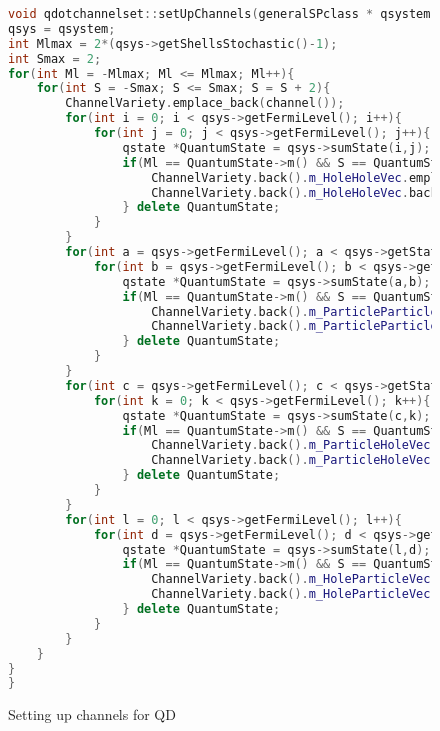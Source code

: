 \documentclass[twoside,english]{uiofysmaster}
\theoremstyle{definition}
\begin{document}
\begin{figure}
\begin{lstlisting}[language=C++]
void qdotchannelset::setUpChannels(generalSPclass * qsystem){
qsys = qsystem;
int Mlmax = 2*(qsys->getShellsStochastic()-1);
int Smax = 2;
for(int Ml = -Mlmax; Ml <= Mlmax; Ml++){
	for(int S = -Smax; S <= Smax; S = S + 2){
		ChannelVariety.emplace_back(channel());
		for(int i = 0; i < qsys->getFermiLevel(); i++){
			for(int j = 0; j < qsys->getFermiLevel(); j++){
				qstate *QuantumState = qsys->sumState(i,j);
				if(Ml == QuantumState->m() && S == QuantumState->s() && i != j){
					ChannelVariety.back().m_HoleHoleVec.emplace_back(channelindexpair());
					ChannelVariety.back().m_HoleHoleVec.back().set(i, j);
				} delete QuantumState;
			}
		}
		for(int a = qsys->getFermiLevel(); a < qsys->getStatesStochastic(); a++){
			for(int b = qsys->getFermiLevel(); b < qsys->getStatesStochastic(); b++){
				qstate *QuantumState = qsys->sumState(a,b);
				if(Ml == QuantumState->m() && S == QuantumState->s() && a != b){
					ChannelVariety.back().m_ParticleParticleVec.emplace_back(channelindexpair());
					ChannelVariety.back().m_ParticleParticleVec.back().set(a, b);
				} delete QuantumState;
			}
		}
		for(int c = qsys->getFermiLevel(); c < qsys->getStatesStochastic(); c++){
			for(int k = 0; k < qsys->getFermiLevel(); k++){
				qstate *QuantumState = qsys->sumState(c,k);
				if(Ml == QuantumState->m() && S == QuantumState->s() && c != k){
					ChannelVariety.back().m_ParticleHoleVec.emplace_back(channelindexpair());
					ChannelVariety.back().m_ParticleHoleVec.back().set(c, k);
				} delete QuantumState;
			}
		}
		for(int l = 0; l < qsys->getFermiLevel(); l++){			
			for(int d = qsys->getFermiLevel(); d < qsys->getStatesStochastic(); d++){
				qstate *QuantumState = qsys->sumState(l,d);
				if(Ml == QuantumState->m() && S == QuantumState->s() && l != d){
					ChannelVariety.back().m_HoleParticleVec.emplace_back(channelindexpair());
					ChannelVariety.back().m_HoleParticleVec.back().set(l, d);
				} delete QuantumState;
			}
		}
	}
}
}

\end{lstlisting}
\caption{Setting up channels for QD} \label{f:vectors_for_channels}
\end{figure}
\end{document}
